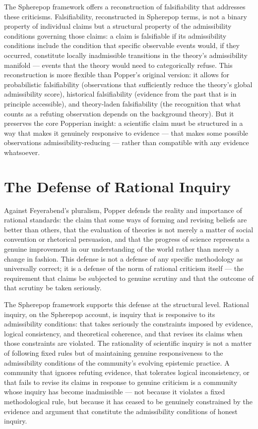 \documentclass[12pt,openany]{book}
\theoremstyle{plain}
\theoremstyle{definition}
\theoremstyle{remark}
\begin{document}
The Spherepop framework offers a reconstruction of falsifiability that addresses these criticisms. Falsifiability, reconstructed in Spherepop terms, is not a binary property of individual claims but a structural property of the admissibility conditions governing those claims: a claim is falsifiable if its admissibility conditions include the condition that specific observable events would, if they occurred, constitute locally inadmissible transitions in the theory's admissibility manifold — events that the theory would need to categorically refuse. This reconstruction is more flexible than Popper's original version: it allows for probabilistic falsifiability (observations that sufficiently reduce the theory's global admissibility score), historical falsifiability (evidence from the past that is in principle accessible), and theory-laden falsifiability (the recognition that what counts as a refuting observation depends on the background theory). But it preserves the core Popperian insight: a scientific claim must be structured in a way that makes it genuinely responsive to evidence — that makes some possible observations admissibility-reducing — rather than compatible with any evidence whatsoever.

\section{The Defense of Rational Inquiry}

Against Feyerabend's pluralism, Popper defends the reality and importance of rational standards: the claim that some ways of forming and revising beliefs are better than others, that the evaluation of theories is not merely a matter of social convention or rhetorical persuasion, and that the progress of science represents a genuine improvement in our understanding of the world rather than merely a change in fashion. This defense is not a defense of any specific methodology as universally correct; it is a defense of the norm of rational criticism itself — the requirement that claims be subjected to genuine scrutiny and that the outcome of that scrutiny be taken seriously.

The Spherepop framework supports this defense at the structural level. Rational inquiry, on the Spherepop account, is inquiry that is responsive to its admissibility conditions: that takes seriously the constraints imposed by evidence, logical consistency, and theoretical coherence, and that revises its claims when those constraints are violated. The rationality of scientific inquiry is not a matter of following fixed rules but of maintaining genuine responsiveness to the admissibility conditions of the community's evolving epistemic practice. A community that ignores refuting evidence, that tolerates logical inconsistency, or that fails to revise its claims in response to genuine criticism is a community whose inquiry has become inadmissible — not because it violates a fixed methodological rule, but because it has ceased to be genuinely constrained by the evidence and argument that constitute the admissibility conditions of honest inquiry.
\end{document}
